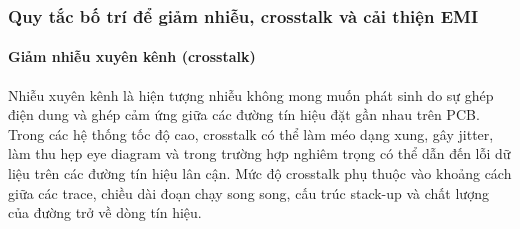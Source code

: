                 \subsubsection{Quy tắc bố trí để giảm nhiễu, crosstalk và cải thiện EMI}
                    \paragraph{Giảm nhiễu xuyên kênh (crosstalk)}
                        Nhiễu xuyên kênh là hiện tượng nhiễu không mong muốn phát sinh do sự ghép điện dung và ghép cảm ứng giữa các đường tín hiệu đặt gần nhau trên PCB. Trong các hệ thống tốc độ cao, crosstalk có thể làm méo dạng xung, gây jitter, làm thu hẹp eye diagram và trong trường hợp nghiêm trọng có thể dẫn đến lỗi dữ liệu trên các đường tín hiệu lân cận. Mức độ crosstalk phụ thuộc vào khoảng cách giữa các trace, chiều dài đoạn chạy song song, cấu trúc stack-up và chất lượng của đường trở về dòng tín hiệu. 
                        
                        

